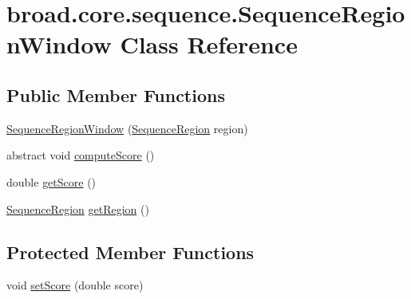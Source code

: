\hypertarget{classbroad_1_1core_1_1sequence_1_1_sequence_region_window}{\section{broad.\+core.\+sequence.\+Sequence\+Region\+Window Class Reference}
\label{classbroad_1_1core_1_1sequence_1_1_sequence_region_window}
}
\subsection*{Public Member Functions}
\begin{DoxyCompactItemize}
\item 
\hyperlink{classbroad_1_1core_1_1sequence_1_1_sequence_region_window_aca389aed2961d7e4f8bf08d45c533385}{Sequence\+Region\+Window} (\hyperlink{classbroad_1_1core_1_1sequence_1_1_sequence_region}{Sequence\+Region} region)
\item 
abstract void \hyperlink{classbroad_1_1core_1_1sequence_1_1_sequence_region_window_ab04991e1445c6bbeb35c2f167f52ce2d}{compute\+Score} ()
\item 
double \hyperlink{classbroad_1_1core_1_1sequence_1_1_sequence_region_window_aa18a140d583dc9ba4a0b2dfa28164b27}{get\+Score} ()
\item 
\hyperlink{classbroad_1_1core_1_1sequence_1_1_sequence_region}{Sequence\+Region} \hyperlink{classbroad_1_1core_1_1sequence_1_1_sequence_region_window_a9c0e9ea5d3532cea285c2e222a904d61}{get\+Region} ()
\end{DoxyCompactItemize}
\subsection*{Protected Member Functions}
\begin{DoxyCompactItemize}
\item 
void \hyperlink{classbroad_1_1core_1_1sequence_1_1_sequence_region_window_a6b00804f980b26a9efdfbcd225cbf451}{set\+Score} (double score)
\end{DoxyCompactItemize}


